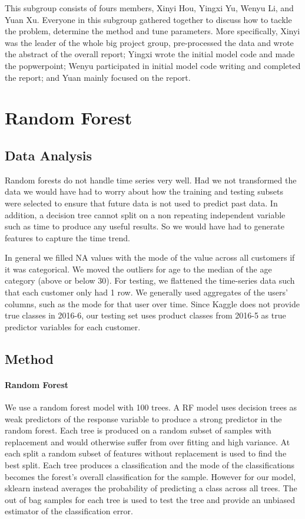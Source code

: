\documentclass{article}
\begin{document}
\begin{spacing}{1}
\begin{large}
This subgroup consists of fours members, Xinyi Hou, Yingxi Yu, Wenyu Li, and Yuan Xu. Everyone in this subgroup gathered together to discuss how to tackle the problem, determine the method and tune parameters. More specifically, Xinyi was the leader of the whole big project group, pre-processed the data and wrote the abstract of the overall report; Yingxi wrote the initial model code and made the popwerpoint; Wenyu participated in initial model code writing and completed the report; and Yuan mainly focused on the report.

\section{Random Forest}
	
\subsection{Data Analysis}

Random forests do not handle time series very well. Had we not transformed the data we would have had to worry about how the training and testing subsets were selected to ensure that future data is not used to predict past data. In addition, a decision tree cannot split on a non repeating independent variable such as time to produce any useful results. So we would have had to generate features to capture the time trend.

In general we filled NA values with the mode of the value across all customers if it was categorical. We moved the outliers for age to the median of the age category (above or below 30). 
For testing, we flattened the time-series data such that each customer only had 1 row. We generally used aggregates of the users' columns, such as the mode for that user over time. 
Since Kaggle does not provide true classes in 2016-6, our testing set uses product classes from 2016-5 as true predictor variables for each customer.

\subsection{Method}

\paragraph{Random Forest}
We use a random forest model with 100 trees. A RF model uses decision trees as weak predictors of the response variable to produce a strong predictor in the random forest. Each tree is produced on a random subset of samples with replacement and would otherwise suffer from over fitting and high variance. At each split a random subset of features without replacement is used to find the best split. Each tree produces a classification and the mode of the classifications becomes the forest's overall classification for the sample. However for our model, sklearn instead averages the probability of predicting a class across all trees.\cite{rnSKlearn}  The out of bag samples for each tree is used to test the tree and provide an unbiased estimator of the classification error.\cite{rnLeo} 


\end{large}
\end{spacing}
\end{document}
